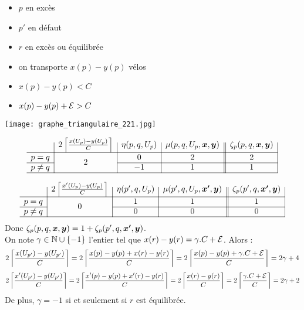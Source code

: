 \begin{minipage}{0.5\linewidth}
\begin{itemize}
\item $p$ en excès
\item $p'$ en défaut
\item $r$ en excès ou équilibrée
\item on transporte $x(p)-y(p)$ vélos
\item $x(p)-y(p) < C$
\item $x(p) - y(p) + \mathcal{E} > C$
\end{itemize}
\end{minipage}
\begin{minipage}{0.5\linewidth}
\begin{center}
\texttt{[image: graphe\_triangulaire\_221.jpg]}
\end{center}
\end{minipage}

\begin{gather*}
  \begin{array}{c|c|c|c||c|}
    & 2 \left\lceil \frac{x(U_p)-y(U_p)}{C} \right\rceil
    & \eta(p,q,U_p)
    & \mu(p,q,U_p,\bs{x},\bs{y})
    & \zeta_p(p,q,\bs{x},\bs{y})
    \\ \hline
    p=q
    & \multirow{2}{*}{$2$}
    & 0
    & 2
    & 2
    \\ \cline{1-1}\cline{3-5}
    p \ne q
    &
    & -1
    & 1
    & 1
    \\ \hline
  \end{array}
\end{gather*}

\begin{gather*}
  \begin{array}{c|c|c|c||c|}
    & 2 \left\lceil \frac{x'(U_p)-y(U_p)}{C} \right\rceil
    & \eta(p',q,U_p)
    & \mu(p',q,U_p,\bs{x'},\bs{y})
    & \zeta_p(p',q,\bs{x'},\bs{y})
    \\ \hline
    p=q
    & \multirow{2}{*}{$0$}
    & 1
    & 1
    & 1
    \\ \cline{1-1}\cline{3-5}
    p \ne q
    &
    & 0
    & 0
    & 0
    \\ \hline
  \end{array}
\end{gather*}
Donc $\zeta_p(p,q,\boldsymbol{x},\boldsymbol{y}) = 1 + \zeta_p(p',q,\boldsymbol{x'},\boldsymbol{y})$.
\\

On note $\gamma \in \mathbb{N} \cup \{-1\}$ l'entier tel que $x(r)-y(r)=\gamma. C + \mathcal{E}$. Alors :
\[
2 \left\lceil \frac{x(U_{p'})-y(U_{p'})}{C} \right\rceil
= 2 \left\lceil \frac{x(p)-y(p)+x(r)-y(r)}{C} \right\rceil
= 2 \left\lceil \frac{x(p)-y(p)+\gamma. C + \mathcal{E}}{C} \right\rceil
= 2\gamma + 4
\]
\[
2 \left\lceil \frac{x'(U_{p'})-y(U_{p'})}{C} \right\rceil
= 2 \left\lceil \frac{x'(p)-y(p)+x'(r)-y(r)}{C} \right\rceil
= 2 \left\lceil \frac{x(r)-y(r)}{C} \right\rceil
= 2 \left\lceil \frac{\gamma. C + \mathcal{E}}{C} \right\rceil
= 2\gamma + 2
\]
De plus, $\gamma = -1$ si et seulement si $r$ est équilibrée.

